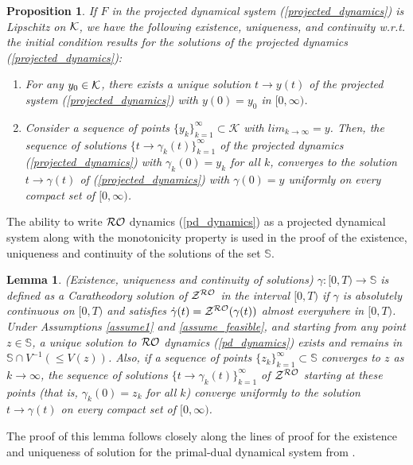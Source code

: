 \documentclass[journal,twoside,web]{ieeecolor}
\newtheorem{lemma}{Lemma}
\newtheorem{proposition}[theorem]{Proposition}
\begin{document}
\begin{proposition} \label{proposition_projected}
If $F$ in the projected dynamical system (\ref{projected_dynamics}) is Lipschitz on ${\cal K}$, we have the following existence, uniqueness, and continuity w.r.t. the initial condition results for the solutions of the projected dynamics (\ref{projected_dynamics}):
\begin{enumerate}
\item For any $y_{0} \in {\cal K}$, there exists a unique solution $t \rightarrow y(t)$ of the projected system (\ref{projected_dynamics}) with $y(0)=y_{0}$ in $[0,\infty)$.
\item Consider a sequence of points $\{y_{k}\}_{k=1}^\infty \subset {\mathcal K}$ with $lim_{k \rightarrow \infty}=y$. Then, the sequence of solutions $\{t \rightarrow \gamma_k(t)\}_{k=1}^\infty$ of the projected dynamics (\ref{projected_dynamics}) with $\gamma_k(0)=y_k$ for all $k$, converges to the solution $t \rightarrow \gamma(t)$ of (\ref{projected_dynamics}) with $\gamma(0)=y$ uniformly on every compact set of $[0,\infty)$.
\end{enumerate}
\end{proposition}
The ability to write ${\cal RO}$ dynamics (\ref{pd_dynamics}) as a projected dynamical system along with the monotonicity property is used in the proof of the existence, uniqueness and continuity of the solutions of the set ${\mathbb S}$.

\begin{lemma} \label{uniq_exis}
(Existence, uniqueness and continuity of solutions)
$\gamma:[0,T) \rightarrow {\mathbb S}$ is defined as a Caratheodory solution of ${\cal Z}^{\cal RO}$ in the interval $[0,T)$ if $\gamma$ is absolutely continuous on $[0,T)$ and satisfies $\dot \gamma(t)={\cal Z}^{\cal RO} (\gamma(t))$ almost everywhere in $[0,T)$. 
Under Assumptions \ref{assume1} and \ref{assume_feasible}, and starting from any point $z\in \mathbb S$, a unique solution to ${\cal RO}$ dynamics (\ref{pd_dynamics}) exists and remains in $\mathbb S \cap V^{-1}(\leq V(z))$. Also, if a sequence of points $\{z_k\}_{k=1}^\infty \subset {\mathbb S}$ converges to $z$ as $k \rightarrow \infty$, the sequence of solutions $\{t \rightarrow \gamma_k(t)\}_{k=1}^\infty$ of ${\cal Z}^{\cal RO}$ starting at these points (that is, $\gamma_k(0)=z_k$ for all $k$) converge uniformly to the solution $t \rightarrow \gamma(t)$ on every compact set of $[0,\infty)$.
\end{lemma}
The proof of this lemma follows closely along the lines of proof for the existence and uniqueness of solution for the primal-dual dynamical system from \cite[Lemma~4.3]{cherukuri2016}. 
\end{document}
